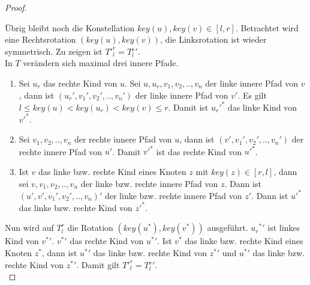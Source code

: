 \documentclass[a4paper,12pt]{article}
\begin{document}
\begin{proof}
\begin{enumerate}
	\end{enumerate}	
	\noindent Übrig bleibt noch die Konstellation $\mathit{key}\left(u\right),\mathit{key}(v) \in \left[l,r\right]$. 
	Betrachtet wird eine Rechtsrotation $\left(\mathit{key}\left(u\right),\mathit{key}\left(v\right)\right)$, die Linksrotation ist wieder symmetrisch. 
	Zu zeigen ist ${T'}^r_l = T{^r_l}' $.\\
	In $T$ verändern sich maximal drei innere Pfade.
	\begin{enumerate}
		\item Sei $u_r$ das rechte Kind von $u$. Sei $u,u_r,v_1, v_2,..,v_n$ der linke innere Pfad von $v$, dann ist $\left({u_r}',{v_1}',{v_2}',..,{v_n}'\right)$ der linke innere Pfad von $v'$. Es gilt ${l \leq \mathit{key}\left(u\right) < \mathit{key}\left(u_r\right) < \mathit{key}\left(v\right) \leq r}$. Damit ist ${{u_r}'}^*$ das linke Kind von ${v'}^*$.
		\item Sei $v_1, v_2,..,v_n$ der rechte innere Pfad von $u$, dann ist $\left(v',{v_1}', {v_2}',..,{v_n}'\right)$ der rechte innere Pfad von $u'$. Damit  ${v'}^*$ ist das rechte Kind von ${u'}^*$.
		\item Ist $v$ das linke bzw. rechte Kind eines Knoten $z$ mit $\mathit{key}(z) \in \left[r,l\right]$, dann sei  $v,v_1, v_2,..,v_n$ der linke bzw. rechte innere Pfad von $z$. Dann ist  $\left(u',v',{v_1}', {v_2}',..,{v_n}\right)'$ der linke bzw. rechte innere Pfad von $z'$. Dann ist ${u'}^*$ das linke bzw. rechte Kind von ${z'}^*$.
	\end{enumerate}
	\noindent Nun wird auf ${T}^r_l$ die Rotation $ \left(\mathit{key}\left(u^*\right),\mathit{key}\left(v^*\right)\right)$ ausgeführt. ${{u_r}^*}'$ ist linkes Kind von $v{^*}'$. $v{^*}'$ das rechte Kind von $u{^*}'$. Ist $v^*$ das linke bzw. rechte Kind eines Knoten $z^*$, dann ist $u{^*}'$ das linke bzw. rechte Kind von $z{^*}'$ und $u{^*}'$ das linke bzw. rechte Kind von $z{^*}'$. Damit gilt ${T'}^r_l = T{^r_l}'$.\\
	
\end{proof}
\end{document}
